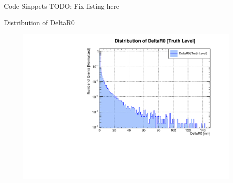 \begin{frame}{Code Sinppets}
	TODO: Fix listing here


\end{frame}

\begin{frame}{Distribution of DeltaR0}
	\begin{figure}
		\includegraphics[width=\linewidth]{./output/DeltaR0.pdf}
	\end{figure}
\end{frame}

